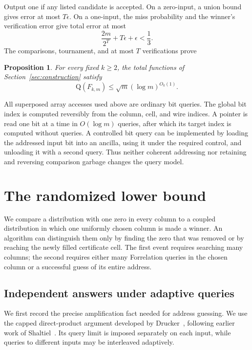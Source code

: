 \documentclass[11pt]{article}
\newtheorem{proposition}[theorem]{Proposition}
\theoremstyle{definition}
\newcommand{\Q}{\mathrm Q}
\begin{document}
Output one if any listed candidate is accepted. On a zero-input, a
union bound gives error at most $T\epsilon$. On a one-input, the miss
probability and the winner's verification error give total error at most
\[
 \frac{2m}{2^T}+T\epsilon+\epsilon<\frac13.
\]
The comparisons, tournament, and at most $T$ verifications prove
\begin{proposition}\label{prop:quantum}
For every fixed $k\ge2$, the total functions of
Section~\ref{sec:construction} satisfy
\[
 \Q(F_{k,m})\le\sqrt m(\log m)^{O_k(1)}.
\]
\end{proposition}

All superposed array accesses used above are ordinary bit queries.
The global bit index is computed reversibly from the column, cell, and
wire indices. A pointer is read one bit at a time in $O(\log m)$ queries,
after which its target index is computed without queries. A controlled
bit query can be implemented by loading the addressed input bit into
an ancilla, using it under the required control, and unloading it with
a second query. Thus neither coherent addressing nor retaining and
reversing comparison garbage changes the query model.

\section{The randomized lower bound}
\label{sec:classical}

We compare a distribution with one zero in every column to a coupled
distribution in which one uniformly chosen column is made a winner.
An algorithm can distinguish them only by finding the zero that was
removed or by reaching the newly filled certificate cell.  The first
event requires searching many columns; the second requires either many
Forrelation queries in the chosen column or a successful guess of its
entire address.

\subsection{Independent answers under adaptive queries}

We first record the precise amplification fact needed for address
guessing.  We use the capped direct-product argument developed by
Drucker~\cite[Section~1.3 and Lemmas~3.1--3.2]{Drucker12}, following
earlier work of Shaltiel~\cite{Shaltiel03}.  Its query limit is imposed
separately on each input, while queries to different inputs may be
interleaved adaptively.
\end{document}
